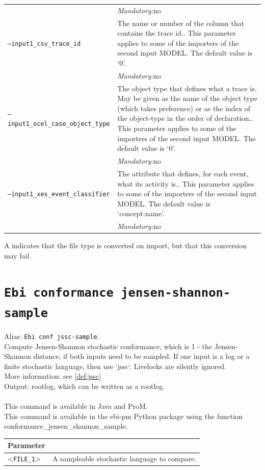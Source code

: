 {\begin{tabularx}{\linewidth}{lX}
&\textit{Mandatory:}\quad no\\
\texttt{--input1\_csv\_trace\_id} & The name or number of the column that contains the trace id.. This parameter applies to some of the importers of the second input MODEL. The default value is `0'.\\
&\textit{Mandatory:}\quad no\\
\texttt{--input1\_ocel\_case\_object\_type} & The object type that defines what a trace is. May be given as the name of the object type (which takes preference) or as the index of the object-type in the order of declaration.. This parameter applies to some of the importers of the second input MODEL. The default value is `0'.\\
&\textit{Mandatory:}\quad no\\
\texttt{--input1\_xes\_event\_classifier} & The attribute that defines, for each event, what its activity is.. This parameter applies to some of the importers of the second input MODEL. The default value is `concept:name'.\\
&\textit{Mandatory:}\quad no\\
\bottomrule
\end{tabularx}
A \textdagger{} indicates that the file type is converted on import, but that this conversion may fail.
\clearpage\section{\texttt{Ebi conformance jensen-shannon-sample}}
\label{command:Ebi conformance jensen-shannon-sample}
Alias: \texttt{Ebi conf jssc-sample}.\\
Compute Jensen-Shannon stochastic conformance, which is 1 - the Jensen-Shannon distance, if both inputs need to be sampled. 
        If one input is a log or a finite stochastic language, then use `jssc`.
        Livelocks are silently ignored.\\
More information: see \cref{def:jssc}~\\
\noindent Output: rootlog, which can be written as a rootlog.\\
\\This command is available in Java and ProM.
\\This command is available in the ebi-pm Python package using the function conformance\_jensen\_shannon\_sample.
\begin{tabularx}{\linewidth}{lX}
\toprule
Parameter \\\midrule
<\texttt{FILE\_1}>&A sampleable stochastic language to compare.\\

\end{tabularx}}
